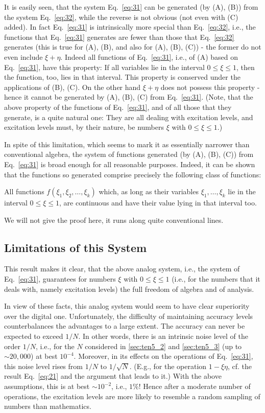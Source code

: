 \documentclass[twocolumn,preprintnumbers,amsmath,amssymb,floatfix]{revtex4}
\begin{document}
It is easily seen, that the system Eq.~\ref{eq:31} can be
generated (by (A), (B)) from the system Eq.~\ref{eq:32}, while the
reverse is not obvious (not even with (C) added). In fact
Eq.~\ref{eq:31} is intrinsically more special than
Eq.~\ref{eq:32}, i.e., the functions that Eq.~\ref{eq:31}
generates are fewer than those that Eq.~\ref{eq:32} generates
(this is true for (A), (B), and also for (A), (B), (C)) - the
former do not even include $\xi+\eta$. Indeed all functions of
Eq.~\ref{eq:31}, i.e., of (A) based on Eq.~\ref{eq:31}, have this
property: If all variables lie in the interval $0\leq\xi\leq1$,
then the function, too, lies in that interval. This property is
conserved under the applications of (B), (C). On the other hand
$\xi+\eta$ does not possess this property - hence it cannot be
generated by (A), (B), (C) from Eq.~\ref{eq:31}. (Note, that the
above property of the functions of Eq.~\ref{eq:31}, and of all
those that they generate, is a quite natural one: They are all
dealing with excitation levels, and excitation levels must, by
their nature, be numbers $\xi$ with $0\leq\xi\leq1$.)

In spite of this limitation, which seems to mark it as essentially
narrower than conventional algebra, the system of functions
generated (by (A), (B), (C)) from Eq.~\ref{eq:31} is broad enough
for all reasonable purposes. Indeed, it can be shown that the
functions so generated comprise precisely the following class of
functions:

All functions $f(\xi_1,\xi_2,\ldots,\xi_k)$ which, as long as
their variables $\xi_1,\ldots,\xi_k$ lie in the interval
$0\leq\xi\leq1$, are continuous and have their value lying in that
interval too.

We will not give the proof here, it runs along quite conventional
lines.

\subsection{\label{sec:twelve4}Limitations of this System}

This result makes it clear, that the above analog system, i.e.,
the system of Eq.~\ref{eq:31}, guarantees for numbers $\xi$ with
$0\leq\xi\leq1$ (i.e., for the numbers that it deals with, namely
excitation levels) the full freedom of algebra and of analysis.

In view of these facts, this analog system would seem to have
clear superiority over the digital one. Unfortunately, the
difficulty of maintaining accuracy levels counterbalances the
advantages to a large extent. The accuracy can never be expected
to exceed $1/N$. In other words, there is an intrinsic noise level
of the order $1/N$, i.e., for the $N$ considered in
\ref{sec:ten5_2} and \ref{sec:ten5_3} (up to $\sim20,000$) at best
$10^{-4}$. Moreover, in its effects on the operations of
Eq.~\ref{eq:31}, this noise level rises from $1/N$ to
$1/\sqrt{N}$. (E.g., for the operation $1-\xi\eta$, cf. the result
Eq.~\ref{eq:21} and the argument that leads to it.) With the above
assumptions, this is at best $\sim10^{-2}$, i.e., $1\%$! Hence
after a moderate number of operations, the excitation levels are
more likely to resemble a random sampling of numbers than
mathematics.
\end{document}
